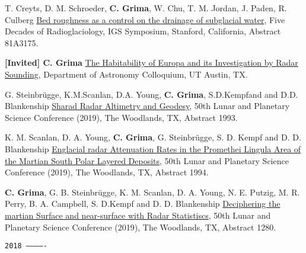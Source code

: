 \begin{etaremune}
  T. Creyts, D. M. Schroeder, \textbf{C. Grima}, W. Chu, T. M. Jordan,
  J. Paden, R. Culberg
  \href{https://www.igsoc.org/symposia/2019/stanford/proceedings/programmepure.html\#Prog3175}{Bed
  roughness as a control on the drainage of subglacial water}, Five
  Decades of Radioglaciology, IGS Symposium, Stanford, California,
  Abstract 81A3175.
\item
  \textbf{{[}Invited{]} C. Grima}
  \href{https://astronomy.utexas.edu/calendar/icalrepeat.detail/2019/05/07/1040/-/cyril-grima-ut-institute-for-geophysics?filter_reset=1\#abstract}{The
  Habitability of Europa and its Investigation by Radar Sounding},
  Department of Astronomy Colloquium, UT Austin, TX.
\item
  G. Steinbrügge, K.M.Scanlan, D.A. Young, \textbf{C. Grima},
  S.D.Kempfand and D.D. Blankenship
  \href{https://www.hou.usra.edu/meetings/lpsc2019/pdf/1993.pdf}{Sharad
  Radar Altimetry and Geodesy}, 50th Lunar and Planetary Science
  Conference (2019), The Woodlands, TX, Abstract 1993.
\item
  K. M. Scanlan, D. A. Young, \textbf{C. Grima}, G. Steinbrügge, S. D.
  Kempf and D. D. Blankenship
  \href{https://www.hou.usra.edu/meetings/lpsc2019/pdf/1994.pdf}{Englacial
  radar Attenuation Rates in the Promethei Lingula Area of the Martian
  South Polar Layered Deposits}, 50th Lunar and Planetary Science
  Conference (2019), The Woodlands, TX, Abstract 1994.
\item
  \textbf{C. Grima}, G. B. Steinbrügge, K. M. Scanlan, D. A. Young, N.
  E. Putzig, M. R. Perry, B. A. Campbell, S. D.Kempf and D. D.
  Blankenship
  \href{https://www.hou.usra.edu/meetings/lpsc2019/pdf/1280.pdf}{Deciphering
  the martian Surface and near-surface with Radar Statistiscs}, 50th
  Lunar and Planetary Science Conference (2019), The Woodlands, TX,
  Abstract 1280.

\hspace{-2em}\texttt{2018 -------------}


\end{etaremune}
